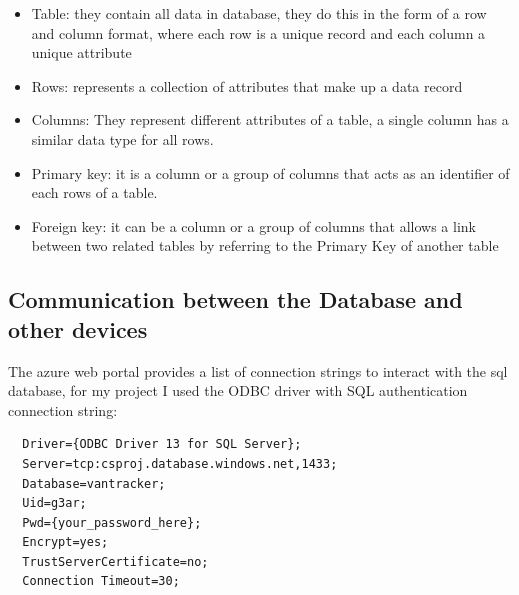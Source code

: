 \begin{itemize}
  \item Table: they contain all data in database, they do this in the form of a row and column format, where each row is a unique record and each column a unique attribute
  \item Rows: represents a collection of attributes that make up a data record 
  \item Columns: They represent different attributes of a table, a single column has a similar data type for all rows.
  \item Primary key: it is a column or a group of columns that acts as an identifier of each rows of a table.
  \item Foreign key: it can be a column or a group of columns that allows a link between two related tables by referring to the Primary Key of another table
\end{itemize}

\subsection{Communication between the Database and other devices}
The azure web portal provides a list of connection strings to interact with the sql database, for my project I used the ODBC driver with SQL authentication connection string:
\begin{verbatim}
  Driver={ODBC Driver 13 for SQL Server};
  Server=tcp:csproj.database.windows.net,1433;
  Database=vantracker;
  Uid=g3ar;
  Pwd={your_password_here};
  Encrypt=yes;
  TrustServerCertificate=no;
  Connection Timeout=30;
\end{verbatim}




